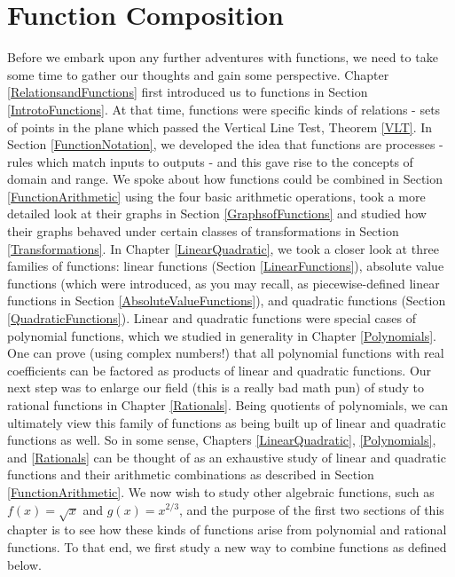 \section{Function Composition}

\label{FunctionComposition}

Before we embark upon any further adventures with functions, we need to take some time to gather our thoughts and gain some perspective.  Chapter \ref{RelationsandFunctions} first introduced us to functions in Section \ref{IntrotoFunctions}.  At that time, functions were specific kinds of relations - sets of points in the plane which passed the Vertical Line Test, Theorem \ref{VLT}.  In Section \ref{FunctionNotation}, we developed the idea that functions are processes - rules which match inputs to outputs - and this gave rise to the concepts of domain and range.  We spoke about how functions could be combined in Section \ref{FunctionArithmetic} using the four basic arithmetic operations, took a more detailed look at their graphs in Section \ref{GraphsofFunctions} and studied how their graphs behaved under certain classes of transformations in Section \ref{Transformations}.  In Chapter \ref{LinearQuadratic}, we took a closer look at three families of functions: linear functions (Section \ref{LinearFunctions}), absolute value functions (which were introduced, as you may recall, as piecewise-defined linear functions in Section \ref{AbsoluteValueFunctions}), and quadratic functions (Section \ref{QuadraticFunctions}).  Linear and quadratic functions were special cases of polynomial functions, which we studied in generality in Chapter \ref{Polynomials}. One can prove (using complex numbers!) that all polynomial functions with real coefficients can be factored as products of linear and quadratic functions.  Our next step was to enlarge our field (this is a really bad math pun) of study to rational functions in Chapter \ref{Rationals}.  Being quotients of polynomials, we can ultimately view this family of functions as being built up of linear and quadratic functions as well.  So in some sense, Chapters \ref{LinearQuadratic}, \ref{Polynomials}, and \ref{Rationals} can be thought of as an exhaustive study of linear and quadratic functions and their arithmetic combinations as described in Section \ref{FunctionArithmetic}. We now wish to study other algebraic functions, such as $f(x) = \sqrt{x}$ and $g(x) = x^{2/3}$, and the purpose of the first two sections of this chapter is to see how these kinds of functions arise from polynomial and rational functions.  To that end, we first study a new way to combine functions as defined below.

